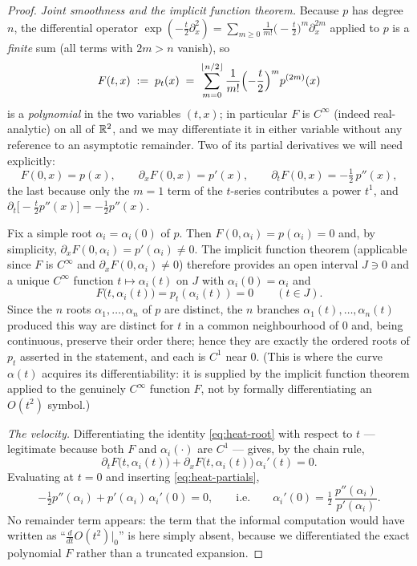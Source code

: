 \begin{proof}
\emph{Joint smoothness and the implicit function theorem.}
Because $p$ has degree $n$, the differential operator
$\exp(-\tfrac t2\partial_x^2)=\sum_{m\ge0}\tfrac{1}{m!}\bigl(-\tfrac t2\bigr)^m\partial_x^{2m}$
applied to $p$ is a \emph{finite} sum (all terms with $2m>n$ vanish), so
\[
F(t,x)\;:=\;p_t(x)\;=\;\sum_{m=0}^{\lfloor n/2\rfloor}\frac{1}{m!}\Bigl(-\frac t2\Bigr)^m p^{(2m)}(x)
\]
is a \emph{polynomial} in the two variables $(t,x)$; in particular $F$ is
$C^\infty$ (indeed real-analytic) on all of $\mathbb{R}^2$, and we may differentiate
it in either variable without any reference to an asymptotic remainder. Two of
its partial derivatives we will need explicitly:
\begin{equation}\label{eq:heat-partials}
F(0,x)=p(x),\qquad \partial_x F(0,x)=p'(x),\qquad
\partial_t F(0,x)=-\tfrac12\,p''(x),
\end{equation}
the last because only the $m=1$ term of the $t$-series contributes a power $t^1$,
and $\partial_t\bigl[-\tfrac t2 p''(x)\bigr]=-\tfrac12 p''(x)$.

Fix a simple root $\alpha_i=\alpha_i(0)$ of $p$. Then $F(0,\alpha_i)=p(\alpha_i)=0$
and, by simplicity, $\partial_x F(0,\alpha_i)=p'(\alpha_i)\ne0$. The implicit
function theorem (applicable since $F$ is $C^\infty$ and $\partial_xF(0,\alpha_i)\ne0$)
therefore provides an open interval $J\ni0$ and a unique $C^\infty$ function
$t\mapsto\alpha_i(t)$ on $J$ with $\alpha_i(0)=\alpha_i$ and
\begin{equation}\label{eq:heat-root}
F\bigl(t,\alpha_i(t)\bigr)=p_t(\alpha_i(t))=0\qquad(t\in J).
\end{equation}
Since the $n$ roots $\alpha_1,\dots,\alpha_n$ of $p$ are distinct, the $n$ branches
$\alpha_1(t),\dots,\alpha_n(t)$ produced this way are distinct for $t$ in a common
neighbourhood of $0$ and, being continuous, preserve their order there; hence they
are exactly the ordered roots of $p_t$ asserted in the statement, and each is
$C^1$ near $0$. (This is where the curve $\alpha(t)$ acquires its differentiability:
it is supplied by the implicit function theorem applied to the genuinely
$C^\infty$ function $F$, not by formally differentiating an $O(t^2)$ symbol.)

\smallskip\noindent\emph{The velocity.}
Differentiating the identity \eqref{eq:heat-root} with respect to $t$ — legitimate
because both $F$ and $\alpha_i(\cdot)$ are $C^1$ — gives, by the chain rule,
\[
\partial_t F\bigl(t,\alpha_i(t)\bigr)+\partial_x F\bigl(t,\alpha_i(t)\bigr)\,\alpha_i'(t)=0 .
\]
Evaluating at $t=0$ and inserting \eqref{eq:heat-partials},
\[
-\tfrac12 p''(\alpha_i)+p'(\alpha_i)\,\alpha_i'(0)=0,
\qquad\text{i.e.}\qquad
\alpha_i'(0)=\tfrac12\,\frac{p''(\alpha_i)}{p'(\alpha_i)} .
\]
No remainder term appears: the term that the informal computation would have
written as ``$\tfrac{d}{dt}O(t^2)\big|_0$'' is here simply absent, because we
differentiated the exact polynomial $F$ rather than a truncated expansion.


\end{proof}
